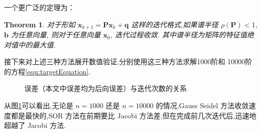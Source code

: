 \documentclass[a4paper]{article}
\numberwithin{equation}{section}
\newtheorem{theorem}{Theorem}
\newcommand{\bm}[1]{\boldsymbol{#1}}    %
\begin{document}
一个更广泛的定理为：
\begin{theorem}
    对于形如 $\bm{x}_{k+1}=\bm{P}\bm{x}_k+\bm{q}$ 这样的迭代格式,如果谱半径 $\rho(\bm{P})<1$, $\bm{b}$  为任意向量, 则对于任意向量 $\bm{x}_{0}$, 迭代过程收敛. 其中谱半径为矩阵的特征值绝对值中的最大值.
\end{theorem}
\newpage
接下来对上述三种方法展开数值验证,分别使用这三种方法求解1000阶和 10000阶的方程\eqref{equ:targetEquation}.
\begin{figure}[htbp]
    \centering
    \quad %
    \caption{误差（本文中误差均为后向误差）与迭代次数的关系}
    \label{fig:11}
\end{figure}

从图\ref{fig:11}可以看出,无论是 $n=1000$ 还是 $n=10000$ 的情况,Gauss Seidel 方法收敛速度都是最快的,SOR 方法在前期要比 Jacobi 方法差,但在完成前几次迭代后,迅速地超越了 Jacobi 方法.
\end{document}
